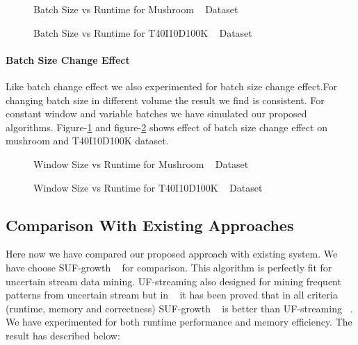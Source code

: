 \documentclass[conference]{IEEEtran}
\begin{document}
        \begin{figure}[h]
        \centering
            
        \caption{Batch Size vs Runtime for Mushroom ~\cite{dataset} Dataset }
        \label{result:g_m_const_batch}
        \end{figure}
        \begin{figure}[h]
        \centering
            
        \caption{Batch Size vs Runtime for T40I10D100K ~\cite{dataset} Dataset }
        \label{result:g_t10_const_batch}
        \end{figure}
         
\paragraph{Batch Size Change Effect}Like batch change effect we also experimented for batch size change effect.For changing batch size in different volume the result we find is consistent. For constant window and variable batches we have simulated our proposed algorithms. Figure-\ref{result:g_m_const_batch} and figure-\ref{result:g_t10_const_batch} shows effect of batch size change effect on mushroom and T40I10D100K dataset.
        \begin{figure}[h]
        \centering
            
        \caption{Window Size vs Runtime for Mushroom ~\cite{dataset} Dataset }
        \label{result:g_m_const_win}
        \end{figure}
        \begin{figure}[h]
        \centering
            
        \caption{Window Size vs Runtime for T40I10D100K ~\cite{dataset} Dataset }
        \label{result:g_t10_const_win}
        \end{figure}
        
\subsection{Comparison With Existing Approaches}
Here now we have compared our proposed approach with existing system. We have choose SUF-growth ~\cite{suf_growth}  for comparison. This algorithm is perfectly fit for uncertain stream data mining. UF-streaming also designed for mining frequent patterns from uncertain stream but in ~\cite{suf_growth} it has been proved that in all criteria (runtime, memory and correctness) SUF-growth ~\cite{suf_growth} is better than UF-streaming ~\cite{suf_growth}. We have experimented for both runtime performance and memory efficiency. The result has described below:
\end{document}
